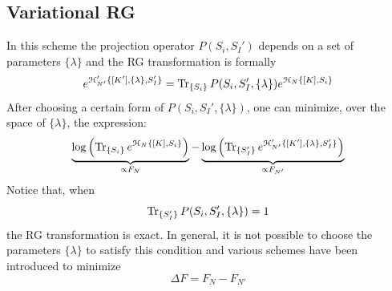 \documentclass[../main/main.tex]{subfiles}
\begin{document}
\subsection{Variational RG}
In this scheme the projection operator \( P(S_i,S_I') \) depends on a set of parameters \( \{ \lambda  \}   \) and the RG transformation is formally
\begin{equation*}
  e^{\mathcal{H}_{N'}' \{ [K'], \{ \lambda  \}, S_I'   \}  } = \Tr_{\{ S_i \}  } P (S_i,S_I', \{ \lambda  \}  ) e^{\mathcal{H}_N \{ [K], S_i \}  }
\end{equation*}
After choosing a certain form of \(  P (S_i,S_I', \{ \lambda  \}  ) \), one can minimize, over the space of \( \{ \lambda  \}   \), the expression:
\begin{equation*}
  \underbrace{ \log \qty(  \Tr_{\{ S_i \}  }   e^{\mathcal{H}_N \{ [K], S_i \}  } )  }_{\propto F_N}
  - \underbrace{\log \qty(  \Tr_{\{ S_I' \}  }   e^{\mathcal{H}_{N'}' \{ [K'], \{ \lambda  \}, S_I'   \}  }   )    }_{\propto F_{N'}}
\end{equation*}
Notice that, when
\begin{equation*}
   \Tr_{\{ S_I' \}  }  P (S_i,S_I', \{ \lambda  \}  ) = 1
\end{equation*}
the RG transformation is exact. In general, it is not possible to choose the parameters \(  \{ \lambda  \} \) to satisfy this condition and various schemes have been introduced to minimize
\begin{equation*}
  \Delta F = F_N - F_{N'}
\end{equation*}
\end{document}
